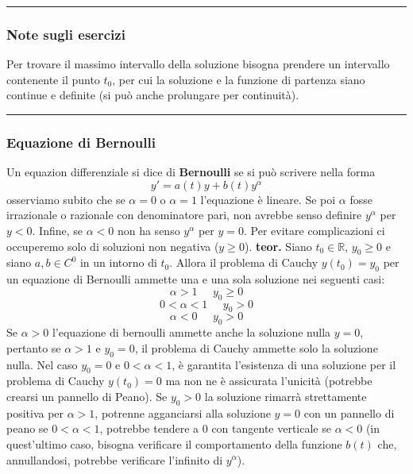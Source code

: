 \rule{\textwidth}{0,4pt}\newline
\begin{tcolorbox}
    \subsubsection*{Note sugli esercizi}
    Per trovare il massimo intervallo della soluzione bisogna prendere un intervallo contenente il punto $t_0$, per cui la soluzione e la funzione di partenza siano continue e definite (si può anche prolungare per continuità).\newline
\end{tcolorbox}
\rule{\textwidth}{0,4pt}
\subsubsection*{Equazione di Bernoulli}
Un equazion differenziale si dice di \textbf{Bernoulli} se si può scrivere nella forma
\[
    y' = a(t)y + b(t) y^\alpha
\]
osserviamo subito che se $\alpha=0$ o $\alpha = 1$ l'equazione è lineare. Se poi $\alpha$ fosse irrazionale o razionale con denominatore pari, non avrebbe senso definire $y^\alpha$ per $y < 0$. Infine, se $\alpha < 0$ non ha senso $y^\alpha$ per $y=0$.\newline
\newline
Per evitare complicazioni ci occuperemo solo di soluzioni non negativa ($y \geq 0$).\newline
\newline
\textbf{teor.} Siano $t_0 \in \mathbb{R}$, $y_0 \geq 0$ e siano $a,b \in C^0$ in un intorno di $t_0$. Allora il problema di Cauchy $y(t_0) = y_0$ per un equazione di Bernoulli ammette una e una sola soluzione nei seguenti casi:
\[
    \alpha> 1 \;\;\;\;\; y_0 \geq 0
\]
\[
    0< \alpha< 1 \;\;\;\;\;y_0 > 0
\]
\[
    \alpha<0 \;\;\;\;\;y_0 > 0
\]
Se $\alpha > 0$ l'equazione di bernoulli ammette anche la soluzione nulla $y=0$, pertanto se  $\alpha > 1$ e $y_0 = 0$, il problema di Cauchy ammette solo la soluzione nulla.\newline
Nel caso $y_0 = 0$ e $0<\alpha < 1$, è garantita l'esistenza di una soluzione per il problema di Cauchy $y(t_0) = 0$ ma non ne è assicurata l'unicità (potrebbe crearsi un pannello di Peano).\newline
Se $y_0 > 0$ la soluzione rimarrà strettamente positiva per $\alpha > 1$, potrenne agganciarsi alla soluzione $y= 0$ con un pannello di peano se $0< \alpha<1$, potrebbe tendere a $0$ con tangente verticale se $\alpha<0$ (in quest'ultimo caso, bisogna verificare il comportamento della funzione $b(t)$ che, annullandosi, potrebbe verificare l'infinito di $y^\alpha$).\newline
